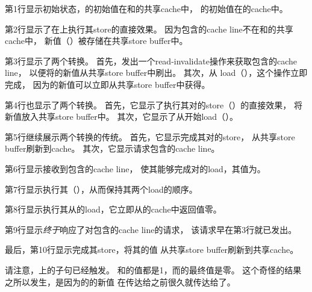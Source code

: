 \QuickQuizEnd

\begin{fcvref}
第1行显示初始状态，的初始值在和的共享cache中，
的初始值在的cache中。

第2行显示了在上执行其store的直接效果。
因为包含的cache line不在和的共享cache中，
新值（）被存储在共享store buffer中。

第3行显示了两个转换。
首先，发出一个read-invalidate操作来获取包含的cache line，
以便将的新值从共享store buffer中刷出。
其次，从 load（），这个操作立即完成，
因为的新值可以立即从共享store buffer中获得。

第4行也显示了两个转换。
首先，它显示了执行其对的store（）的直接效果，
将新值放入共享store buffer中。
其次，它显示了从开始load（）。

第5行继续展示两个转换的传统。
首先，它显示完成其对的store，
从共享store buffer刷新到cache。
其次，它显示请求包含的cache line。

第6行显示接收到包含的cache line，
使其能够完成对的load，其值为。

第7行显示执行其（），从而保持其两个load的顺序。

第8行显示执行其从的load，它立即从的cache中返回值零。

第9行显示\emph{终于}响应了对包含的cache line的请求，
该请求早在第3行就已发出。

最后，第10行显示完成其store，将其的值
从共享store buffer刷新到共享cache。

请注意，上的子句已经触发。
和的值都是1，而的最终值是零。
这个奇怪的结果之所以发生，是因为的的新值
在传达给之前很久就传达给了。
\end{fcvref}

